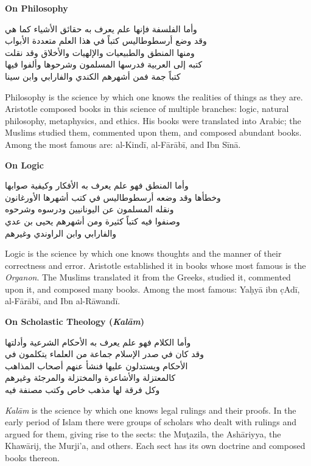 \documentclass[11pt,a4paper]{article}
\newcommand{\ar}[1]{{\arabicfont\beginR #1\endR}}
\newcommand{\bilingual}[2]{%
  \noindent
  \begin{minipage}[t]{0.47\textwidth}
    \vspace{0pt}
    \begin{flushright}
    {\arabicfont\beginR #1\endR}
    \end{flushright}
  \end{minipage}%
  \hfill\vline\hfill
  \begin{minipage}[t]{0.47\textwidth}
    \vspace{0pt}
    #2
  \end{minipage}%
  \par\vspace{0.8em}
}
\newcommand{\bilingualsubsection}[2]{%
  \vspace{0.6em}%
  \noindent
  \begin{minipage}[t]{0.47\textwidth}
    \begin{flushright}
    \textbf{\color{sectioncolor}\ar{#1}}
    \end{flushright}
  \end{minipage}%
  \hfill
  \begin{minipage}[t]{0.47\textwidth}
    \textbf{\color{sectioncolor}#2}
  \end{minipage}%
  \par\vspace{0.4em}%
}
\begin{document}
\bilingualsubsection{في الفلسفة}{On Philosophy}

\bilingual
{وأما الفلسفة فإنها علم يعرف به حقائق الأشياء كما هي\\
وقد وضع أرسطوطاليس كتباً في هذا العلم متعددة الأبواب\\
ومنها المنطق والطبيعيات والإلهيات والأخلاق وقد نقلت\\
كتبه إلى العربية فدرسها المسلمون وشرحوها وألفوا فيها\\
كتباً جمة فمن أشهرهم الكندي والفارابي وابن سينا}
{Philosophy is the science by which one knows the realities of things as
they are. Aristotle composed books in this science of multiple branches:
logic, natural philosophy, metaphysics, and ethics. His books were
translated into Arabic; the Muslims studied them, commented upon them,
and composed abundant books. Among the most famous are: al-Kind\=i,
al-F\=ar\=ab\=i, and Ibn S\=in\=a.}

\bilingualsubsection{في المنطق}{On Logic}

\bilingual
{وأما المنطق فهو علم يعرف به الأفكار وكيفية صوابها\\
وخطأها وقد وضعه أرسطوطاليس في كتب أشهرها الأورغانون\\
ونقله المسلمون عن اليونانيين ودرسوه وشرحوه\\
وصنفوا فيه كتباً كثيرة ومن أشهرهم يحيى بن عدي\\
والفارابي وابن الراوندي وغيرهم}
{Logic is the science by which one knows thoughts and the manner of their
correctness and error. Aristotle established it in books whose most
famous is the \textit{Organon}. The Muslims translated it from the Greeks,
studied it, commented upon it, and composed many books. Among the most
famous: Ya\d{h}y\=a ibn \d{c}Ad\=i, al-F\=ar\=ab\=i, and Ibn
al-R\=awand\=i.}

\bilingualsubsection{في الكلام}{On Scholastic Theology (\textit{Kal\=am})}

\bilingual
{وأما الكلام فهو علم يعرف به الأحكام الشرعية وأدلتها\\
وقد كان في صدر الإسلام جماعة من العلماء يتكلمون في\\
الأحكام ويستدلون عليها فنشأ عنهم أصحاب المذاهب\\
كالمعتزلة والأشاعرة والمختزلة والمرجئة وغيرهم\\
وكل فرقة لها مذهب خاص وكتب مصنفة فيه}
{\textit{Kal\=am} is the science by which one knows legal rulings and their
proofs. In the early period of Islam there were groups of scholars who
dealt with rulings and argued for them, giving rise to the sects: the
Mu\c{t}azila, the Ash\=ariyya, the Khaw\=arij, the Murji'a, and others.
Each sect has its own doctrine and composed books thereon.}
\end{document}
